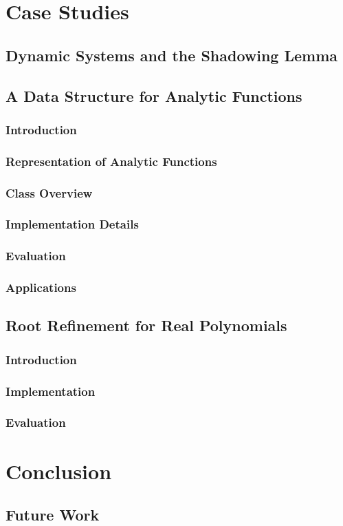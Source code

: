 \documentclass[tudarticle,type=msc,colorback,accentcolor=tud9c]{tudthesis}
\begin{document}
  \chapter{Case Studies}
  \section{Dynamic Systems and the Shadowing Lemma}
  
  \section{A Data Structure for Analytic Functions}
  \subsection{Introduction}
  \subsection{Representation of Analytic Functions}
  \subsection{Class Overview}
  \subsection{Implementation Details}
  \subsection{Evaluation}
  \subsection{Applications}
  \section{Root Refinement for Real Polynomials}
  \subsection{Introduction}
  \subsection{Implementation}
  \subsection{Evaluation}
  \chapter{Conclusion}
  \section{Future Work}
  
\end{document}

